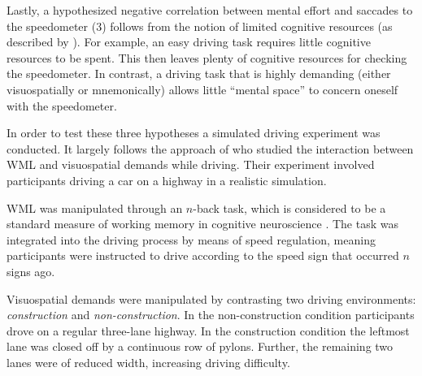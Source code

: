 Lastly, a hypothesized negative correlation between mental effort and saccades to the speedometer (3) follows from the notion of limited cognitive resources (as described by \citet{DeWaard1996}).
For example, an easy driving task requires little cognitive resources to be spent.
This then leaves plenty of cognitive resources for checking the speedometer.
In contrast, a driving task that is highly demanding (either visuospatially or mnemonically) allows little ``mental space'' to concern oneself with the speedometer.

In order to test these three hypotheses a simulated driving experiment was conducted.
It largely follows the approach of \citet{Scheunemann2019} who studied the interaction between WML and visuospatial demands while driving.
Their experiment involved participants driving a car on a highway in a realistic simulation. 

WML was manipulated through an \(n\)-back task, which is considered to be a standard measure of working memory in cognitive neuroscience \citep{Kane2007}.
The task was integrated into the driving process by means of speed regulation, meaning participants were instructed to drive according to the speed sign that occurred \(n\) signs ago.

Visuospatial demands were manipulated by contrasting two driving environments: \textit{construction} and \textit{non-construction}.
In the non-construction condition participants drove on a regular three-lane highway.
In the construction condition the leftmost lane was closed off by a continuous row of pylons.
Further, the remaining two lanes were of reduced width, increasing driving difficulty.
